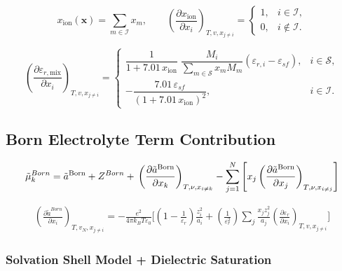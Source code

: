 \documentclass[12pt, letterpaper]{article}
\begin{document}
\begin{equation}
x_{\mathrm{ion}}(\mathbf{x})=\sum_{m\in\mathcal{I}} x_m,
\qquad
\left(\frac{\partial x_{\mathrm{ion}}}{\partial x_i}\right)_{T,v,x_{j\neq i}}
=
\begin{cases}
1, & i\in\mathcal{I},\\
0, & i\notin\mathcal{I}.
\end{cases}
\end{equation}

\begin{equation}
\left(\frac{\partial \varepsilon_{r,\mathrm{mix}}}{\partial x_i}\right)_{T,v,x_{j\neq i}}
=
\begin{cases}
\dfrac{1}{1+7.01\,x_{\mathrm{ion}}}\;
\dfrac{M_i}{\displaystyle \sum_{m\in\mathcal{S}} x_m M_m}
\left(\varepsilon_{r,i}-\varepsilon_{sf}\right),
& i\in\mathcal{S},\\[14pt]
-\dfrac{7.01\,\varepsilon_{sf}}{\left(1+7.01\,x_{\mathrm{ion}}\right)^{2}},
& i\in\mathcal{I}.
\end{cases}
\end{equation}



\subsection{Born Electrolyte Term Contribution}

\begin{equation}
\tilde{\mu}^{Born}_k = \tilde{a}^{\mathrm{Born}} + Z^{Born} + \\\left(\frac{\partial\tilde{a}^{\mathrm{Born}}}{\partial x_{k}}\right)_{T,\nu,x_{i\neq k}}-\sum_{j=1}^{N}\left[x_{j}\left(\frac{\partial\tilde{a}^{\mathrm{Born}}}{\partial x_{j}}\right)_{T,\nu,x_{i\neq j}}\right]
\end{equation}



\begin{equation}
    \begin{aligned}\left(\frac{\partial \tilde{a}^{Born}}{\partial x_{i}}\right)_{T,v_{N},x_{j\neq i}}=-\frac{e^{2}}{4\pi k_{B}T\varepsilon_{0}}\biggl[\left(1-\frac{1}{\varepsilon_{r}}\right)\frac{z_{i}^{2}}{a_{i}} + \left(\frac{1}{\varepsilon_{r}^{2}}\right)\sum_j \frac{x_j z_j^2}{a_j} \left(\frac{\partial\varepsilon_{r}}{\partial x_{i}}\right)_{T,v,x_{j\neq i}} \biggr]\end{aligned}
\end{equation}

\subsubsection{Solvation Shell Model + Dielectric Saturation}
\end{document}
